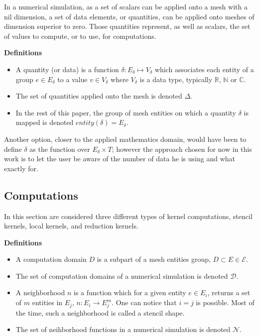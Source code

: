 In a numerical simulation, as a set of scalars can be applied onto a mesh with a nil dimension, a set of data elements, or quantities, can be applied onto meshes of dimension superior to zero. Those quantities represent, as well as scalars, the set of values to compute, or to use, for computations.

\medskip
\noindent \textbf{Definitions}
\begin{itemize}
\item A quantity (or data) is a function $\delta: E_{\delta} \mapsto V_{\delta}$ which associates each entity of a group $e\in E_{\delta}$ to a value $v\in V_{\delta}$ where $V_{\delta}$ is a data type, typically $\mathbb{R}$, $\mathbb{N}$ or $\mathbb{C}$.
\item The set of quantities applied onto the mesh is denoted $\Delta$.
\item In the rest of this paper, the group of mesh entities on which a quantity $\delta$ is mapped is denoted $entity(\delta)=E_{\delta}$.
\end{itemize}

Another option, closer to the applied mathematics domain, would have been to define $\delta$ as the function over $E_{\delta} \times T$; however the approach chosen for now in this work is to let the user be aware of the number of data he is using and what exactly for.

\subsection{Computations}

In this section are considered three different types of kernel computations, stencil kernels, local kernels, and reduction kernels. 

\medskip
\noindent \textbf{Definitions}
\begin{itemize}
\item A computation domain $D$ is a subpart of a mesh entities group, $D \subset E \in \mathcal{E}$.
\item The set of computation domains of a numerical simulation is denoted $\mathcal{D}$.
\item A neighborhood $n$ is a function which for a given entity $e \in E_i$, returns a set of $m$ entities in $E_j$, $n : E_i \rightarrow E_j^m$. One can notice that $i = j$ is possible. Most of the time, such a neighborhood is called a stencil shape.
\item The set of neihborhood functions in a numerical simulation is denoted $\mathcal{N}$.
\end{itemize}

